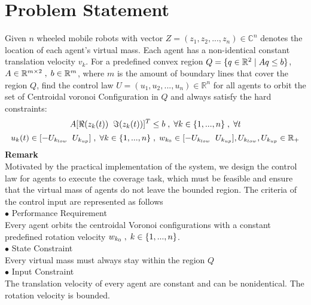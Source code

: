 \section{Problem Statement}
\noindent Given ${n}$ wheeled mobile robots with vector ${Z = (z_1, z_2,..., z_n) \in \mathbb{C}^n}$ denotes the location of each agent's virtual mass. Each agent has  a non-identical constant translation velocity $v_k$. For a predefined convex region ${Q = \{q \in \mathbb{R}^2 \txtspc{|} Aq \leq b\}}$, ${A \in \mathbb{R}^{m \times 2} \txtspc{,} b \in \mathbb{R}^m}$, where ${m}$ is the amount of boundary lines that cover the region ${Q}$, find the control law ${U = (u_1, u_2,..., u_n) \in \mathbb{R}^n }$ for all agents to orbit the set of Centroidal voronoi Configuration in $Q$ and always satisfy the hard constraints:\\
\[A[\Re{(z_k(t))} \txtspc{ } \Im{(z_k(t))}]^T \leq b \txtspc{,} \forall k \in \{1,...,n\} \txtspc{,} \forall t\]
\[u_k(t) \in [-U_{k_{low}}\txtspc{ } U_{k_{up}}]\txtspc{,} \forall k \in \{1,...,n\} \txtspc{,} w_{k_0} \in [-U_{k_{low}} \txtspc{ } U_{k_{up}}] , U_{k_{low}},U_{k_{up}} \in \mathbb{R}_+\]
\noindent \textbf{Remark} \\
Motivated by the practical implementation of the system, we design the control law for agents to execute the coverage task, which must be feasible and ensure that the virtual mass of agents do not leave the bounded region. The criteria of the control input are represented as follows \\
\noindent $\bullet$ Performance Requirement \\
\noindent Every agent orbits the centroidal Voronoi configurations with a constant predefined rotation velocity ${w_{k_0} \txtspc{,} k \in \{1,...,n\}}$. \\ %
\noindent $\bullet$ State Constraint\\
Every virtual mass must always stay within the region ${Q}$ \\
\noindent $\bullet$ Input Constraint\\
The translation velocity of every agent are constant and can be nonidentical. The rotation velocity is bounded.\\ %
